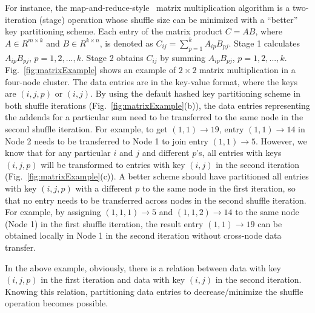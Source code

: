 \documentclass[10pt,journal,compsoc]{IEEEtran}
\begin{document}
For instance, the map-and-reduce-style~\cite{dean2008mapreduce} matrix multiplication algorithm is a two-iteration
(stage) operation whose shuffle size can be minimized with a ``better''
key partitioning scheme.
Each entry of the matrix product $C=AB$, where $A \in R^{m \times k}$ and $B \in R^{k \times n}$, is denoted as $C_{ij}=\sum_{p=1}^k A_{ip}B_{pj}$. 
Stage 1 calculates $A_{ip}B_{pj}$, $p=1, 2, ..., k$. 
Stage 2 obtains $C_{ij}$ by summing $A_{ip}B_{pj}$, $p=1, 2, ..., k$.
Fig.~\ref{fig:matrixExample} shows an example of $2 \times 2$ matrix multiplication in a four-node cluster. 
The data entries are in the key-value format, where the keys are $(i,j,p)$ or $(i,j)$. 
By using the default hashed key partitioning scheme in both shuffle iterations
(Fig.~\ref{fig:matrixExample}(b)), the data entries representing the addends
for a particular sum need to be transferred to the same node in the
second shuffle iteration. %
For example, to get $(1,1) \rightarrow 19$, entry $(1,1)\rightarrow 14$ in Node 2 needs to be transferred to Node 1 to join entry $(1,1) \rightarrow 5$.
However, we know that for any particular $i$ and $j$ and different $p$'s, all entries with keys $(i,j,p)$ will be transformed to 
entries with key $(i,j)$ in
the second iteration (Fig.~\ref{fig:matrixExample}(c)).
A better scheme should have partitioned all entries with key $(i,j,p)$
with a different $p$ to the same node in the first iteration, so that 
no entry needs to be transferred across nodes in the second shuffle
iteration.
For example, by assigning $(1,1,1)\rightarrow 5$ and $(1,1,2)
\rightarrow 14$ to the same node (Node 1) in the first shuffle iteration,
the result entry $(1,1) \rightarrow 19$ can be obtained locally 
in Node 1 in the second iteration without cross-node data transfer.

In the above example, obviously, there is a relation between data with
key $(i,j,p)$ in the first iteration and data with key $(i,j)$ in the second iteration.
Knowing this relation, partitioning data entries 
to decrease/minimize the shuffle operation becomes possible.
\end{document}
